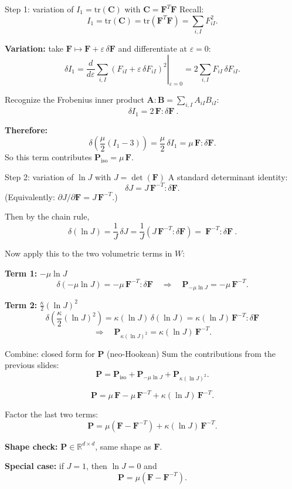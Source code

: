 \documentclass[aspectratio=169]{beamer}
\newcommand{\R}{\mathbb{R}}
\begin{document}
\begin{frame}{Step 1: variation of $I_1=\mathrm{tr}(\bm{C})$ with $\bm{C}=\bm{F}^T\bm{F}$}
\small
Recall:
\[
I_1=\mathrm{tr}(\bm{C})=\mathrm{tr}(\bm{F}^T\bm{F})=\sum_{i,I}F_{iI}^2.
\]

\medskip
\textbf{Variation:} take \(\bm{F}\mapsto \bm{F}+\varepsilon\,\delta\bm{F}\) and differentiate at \(\varepsilon=0\):
\[
\delta I_1
=
\left.\frac{d}{d\varepsilon}\sum_{i,I}(F_{iI}+\varepsilon\,\delta F_{iI})^2\right|_{\varepsilon=0}
=
2\sum_{i,I}F_{iI}\,\delta F_{iI}.
\]

\medskip
Recognize the Frobenius inner product \(\bm{A}:\bm{B}=\sum_{i,I}A_{iI}B_{iI}\):
\[
\boxed{\ \delta I_1 = 2\,\bm{F}:\delta\bm{F}\ }.
\]

\medskip
\textbf{Therefore:}
\[
\delta\!\left(\frac{\mu}{2}(I_1-3)\right)
=\frac{\mu}{2}\,\delta I_1
=\mu\,\bm{F}:\delta\bm{F}.
\]
So this term contributes \(\boxed{\bm{P}_{\text{iso}}=\mu\,\bm{F}}\).
\end{frame}

\begin{frame}{Step 2: variation of $\ln J$ with $J=\det(\bm{F})$}
\small
A standard determinant identity:
\[
\delta J = J\,\bm{F}^{-T}:\delta\bm{F}.
\]
(Equivalently: \(\partial J/\partial \bm{F} = J\,\bm{F}^{-T}\).)

\medskip
Then by the chain rule,
\[
\delta(\ln J) = \frac{1}{J}\,\delta J
= \frac{1}{J}\left(J\,\bm{F}^{-T}:\delta\bm{F}\right)
= \boxed{\ \bm{F}^{-T}:\delta\bm{F}\ }.
\]

\medskip
Now apply this to the two volumetric terms in \(W\):

\medskip
\textbf{Term 1:} \(-\mu \ln J\)
\[
\delta(-\mu\ln J) = -\mu\,\bm{F}^{-T}:\delta\bm{F}
\quad\Rightarrow\quad
\boxed{\bm{P}_{-\mu\ln J}=-\mu\,\bm{F}^{-T}}.
\]

\medskip
\textbf{Term 2:} \(\frac{\kappa}{2}(\ln J)^2\)
\[
\delta\!\left(\frac{\kappa}{2}(\ln J)^2\right)
=\kappa(\ln J)\,\delta(\ln J)
=\kappa(\ln J)\,\bm{F}^{-T}:\delta\bm{F}
\]
\[
\Rightarrow\quad
\boxed{\bm{P}_{\kappa(\ln J)^2}=\kappa(\ln J)\,\bm{F}^{-T}}.
\]
\end{frame}

\begin{frame}{Combine: closed form for $\bm{P}$ (neo-Hookean)}
\small
Sum the contributions from the previous slides:
\[
\bm{P}
=
\bm{P}_{\text{iso}}
+\bm{P}_{-\mu\ln J}
+\bm{P}_{\kappa(\ln J)^2}.
\]

\medskip
\[
\bm{P}
=
\mu\,\bm{F}
-\mu\,\bm{F}^{-T}
+\kappa(\ln J)\,\bm{F}^{-T}.
\]

\medskip
Factor the last two terms:
\[
\boxed{
\bm{P} = \mu\left(\bm{F}-\bm{F}^{-T}\right)+\kappa(\ln J)\,\bm{F}^{-T}.
}
\]

\medskip
\textbf{Shape check:} \(\bm{P}\in\R^{d\times d}\), same shape as \(\bm{F}\).

\medskip
\textbf{Special case:} if \(J=1\), then \(\ln J=0\) and
\[
\bm{P}=\mu(\bm{F}-\bm{F}^{-T}).
\]
\end{frame}
\end{document}
